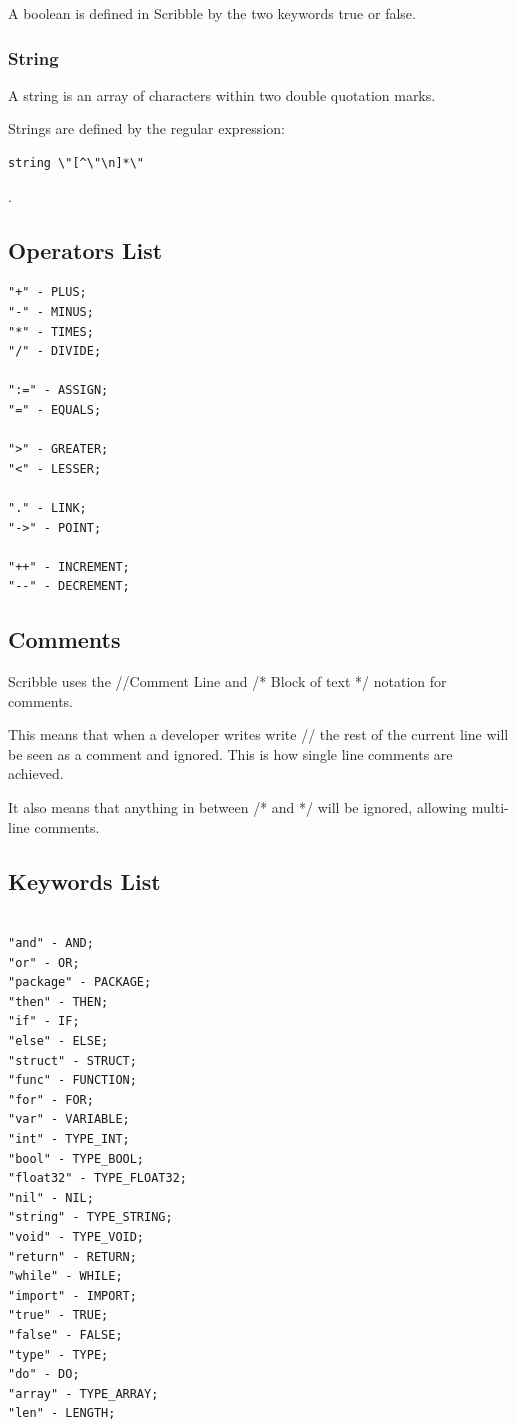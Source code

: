 \documentclass[]{final_report}
\begin{document}
A boolean is defined in Scribble by the two keywords true or false.

\subsubsection{String}

A string is an array of characters within two double quotation marks. 

Strings are defined by the regular expression: \begin{verbatim}
string \"[^\"\n]*\"
\end{verbatim}.

\subsection{Operators List}

\begin{verbatim}
"+" - PLUS;
"-" - MINUS;
"*" - TIMES;
"/" - DIVIDE;

":=" - ASSIGN;
"=" - EQUALS;

">" - GREATER;
"<" - LESSER;

"." - LINK;
"->" - POINT;

"++" - INCREMENT;
"--" - DECREMENT;
\end{verbatim}

\subsection{Comments}

Scribble uses the //Comment Line and /* Block of text */ notation for comments. 

This means that when a developer writes write // the rest of the current line will be seen as a comment and ignored. This is how single line comments are achieved.

It also means that anything in between /* and */ will be ignored, allowing multi-line comments.

\subsection{Keywords List}

\begin{verbatim}

"and" - AND;
"or" - OR;
"package" - PACKAGE;
"then" - THEN;
"if" - IF;
"else" - ELSE;
"struct" - STRUCT;
"func" - FUNCTION;
"for" - FOR;
"var" - VARIABLE;
"int" - TYPE_INT;
"bool" - TYPE_BOOL;
"float32" - TYPE_FLOAT32;
"nil" - NIL;
"string" - TYPE_STRING;
"void" - TYPE_VOID;
"return" - RETURN;
"while" - WHILE;
"import" - IMPORT;
"true" - TRUE;
"false" - FALSE;
"type" - TYPE;
"do" - DO;
"array" - TYPE_ARRAY;
"len" - LENGTH;

\end{verbatim}
\end{document}
